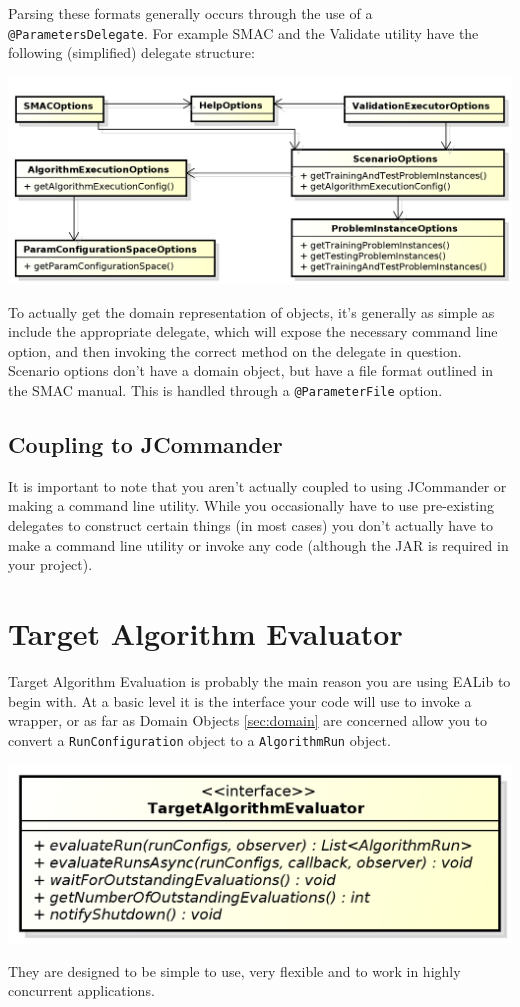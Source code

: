 \documentclass[11pt,letterpaper,oneside]{article}
\begin{document}
Parsing these formats generally occurs through the use of a \texttt{@ParametersDelegate}. For example SMAC and the Validate utility have the following (simplified) delegate structure:

\begin{center}
\includegraphics[scale=0.75]{img/UML/Options2.png}
\end{center}


To actually get the domain representation of objects, it's generally as simple as include the appropriate delegate, which will expose the necessary command line option, and then invoking the correct method on the delegate in question. Scenario options don't have a domain object, but have a file format outlined in the SMAC manual. This is handled through a \texttt{@ParameterFile} option.

\subsection{Coupling to JCommander}

It is important to note that you aren't actually coupled to using JCommander or making a command line utility. While you occasionally have to use pre-existing delegates to construct certain things (in most cases) you don't actually have to make a command line utility or invoke any code (although the JAR is required in your project).


\section{Target Algorithm Evaluator}
\label{sec:tae}
Target Algorithm Evaluation is probably the main reason you are using EALib to begin with. At a basic level it is the interface your code will use to invoke a wrapper, or as far as Domain Objects \ref{sec:domain} are concerned allow you to convert a \texttt{RunConfiguration} object to a \texttt{AlgorithmRun} object.
\begin{center}
\includegraphics[scale=0.75]{img/UML/TAEBasic.png}
\end{center}
They are designed to be simple to use, very flexible and to work in highly concurrent applications.
\end{document}
